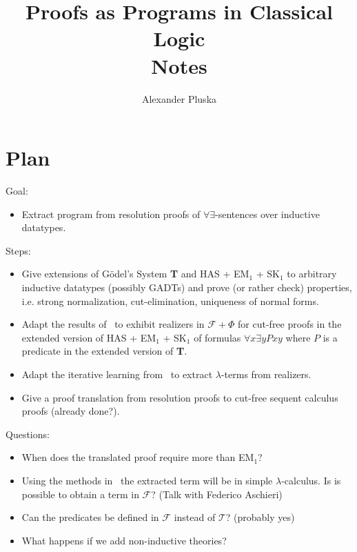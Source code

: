 \documentclass[onehalfspacing]{article}
\author{Alexander Pluska}
\title{Proofs as Programs in Classical Logic\\Notes}
\begin{document}
\maketitle

\section{Plan}

Goal:
\begin{itemize}
	\item Extract program from resolution proofs of $\forall\exists$-sentences over inductive datatypes.
\end{itemize}

\noindent Steps:

\begin{itemize}
	\item Give extensions of G\"odel's System \textbf{T} and HAS + EM$_1$ + SK$_1$ to arbitrary inductive datatypes (possibly GADTs) and prove (or rather check) properties, i.e. strong normalization, cut-elimination, uniqueness of normal forms.
	\item Adapt the results of~\cite{aschieri2014interactive} to exhibit realizers in $\mathcal{F} + \Phi$ for cut-free proofs in the extended version of HAS + EM$_1$ + SK$_1$ of formulas $\forall x\exists y Pxy$ where $P$ is a predicate in the extended version of \textbf{T}.
	\item Adapt the iterative learning from~\cite{aschieri2014interactive} to extract $\lambda$-terms from realizers.
	\item Give a proof translation from resolution proofs to cut-free sequent calculus proofs (already done?).
\end{itemize}

\noindent Questions:
\begin{itemize}
	\item When does the translated proof require more than EM$_1$?
	\item Using the methods in~\cite{aschieri2014interactive} the extracted term will be in simple $\lambda$-calculus. Is is possible to obtain a term in $\mathcal{F}$? (Talk with Federico Aschieri)
	\item Can the predicates be defined in $\mathcal{F}$ instead of $\mathcal{T}$? (probably yes)
	\item What happens if we add non-inductive theories?
	
\end{itemize}
\end{document}
